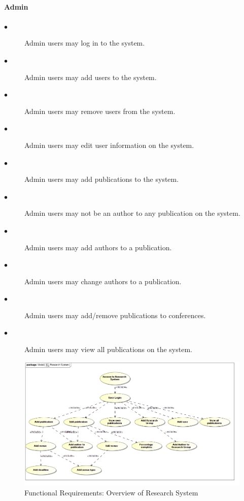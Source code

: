 \documentclass[a4paper]{article}
\begin{document}
	\paragraph{\textbf{Admin}}
	\begin{description}
		\item[$\bullet$] Admin users may log in to the system.
		\item[$\bullet$] Admin users may add users to the system.
		\item[$\bullet$] Admin users may remove users from the system.
		\item[$\bullet$] Admin users may edit user information on the system.
		\item[$\bullet$] Admin users may add publications to the system.
		\item[$\bullet$] Admin users may not be an author to any publication on the system.
		\item[$\bullet$] Admin users may add authors to a publication.
		\item[$\bullet$] Admin users may change authors to a publication.
		\item[$\bullet$] Admin users may add/remove publications to conferences.
		\item[$\bullet$] Admin users may view all publications on the system.
	\end{description}
	\begin{figure}[H]
		\includegraphics[width=\textwidth]{Overview.jpg}
		\caption{Functional Requirements: Overview of Research System \label{overflow}}
	\end{figure}
\end{document}
